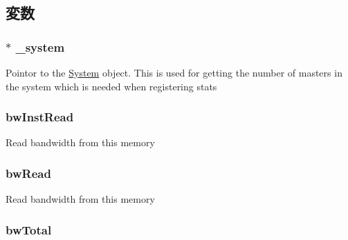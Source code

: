 \subsection{変数}
\hypertarget{classAbstractMemory_a1da55f4024bf8a9b14b64054841148b8}{
\subsubsection[{\_\-system}]{$\ast$ {\bf \_\-system}}}
\label{classAbstractMemory_a1da55f4024bf8a9b14b64054841148b8}
Pointor to the \hyperlink{classSystem}{System} object. This is used for getting the number of masters in the system which is needed when registering stats \hypertarget{classAbstractMemory_a00512ebb77886b71a63bd1595828d592}{
\subsubsection[{bwInstRead}]{ {\bf bwInstRead}}}
\label{classAbstractMemory_a00512ebb77886b71a63bd1595828d592}
Read bandwidth from this memory \hypertarget{classAbstractMemory_a14a0a95f3cd104b70d5b5c19c3ee8099}{
\subsubsection[{bwRead}]{ {\bf bwRead}}}
\label{classAbstractMemory_a14a0a95f3cd104b70d5b5c19c3ee8099}
Read bandwidth from this memory \hypertarget{classAbstractMemory_a678ff8c93c78d0be1884742ef8aa41e8}{
\subsubsection[{bwTotal}]{ {\bf bwTotal}}}
